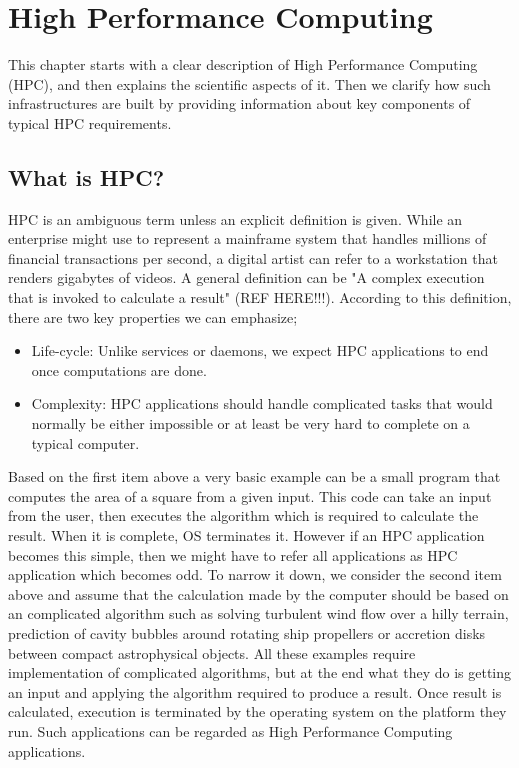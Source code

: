 \chapter{High Performance Computing} \label{chap-hpc}
This chapter starts with a clear description of High Performance Computing (HPC), and then
explains the scientific aspects of it. Then we clarify how such infrastructures are built
by providing information about key components of typical HPC requirements.

\section{What is HPC?}
HPC is an ambiguous term unless an explicit definition is given. While an enterprise might 
use to represent a mainframe system that handles millions of financial transactions per second, 
a digital artist can refer to a workstation that renders gigabytes of videos. A general 
definition can be "A complex execution that is invoked to calculate a result" (REF HERE!!!). 
According to this definition, there are two key properties we can emphasize; 
\begin{itemize}
  \item Life-cycle: Unlike services or daemons, we expect HPC applications to end once 
computations are done.
  \item Complexity: HPC applications should handle complicated tasks that would normally 
be either impossible or at least be very hard to complete on a typical computer.
\end{itemize}
Based on the first item above a very basic example can be a small program that computes 
the area of a square from a given input. This code can take an input from the user, then 
executes the algorithm which is required to calculate the result. When it is complete, OS 
terminates it. 
\newline \newline
However if an HPC application becomes this simple, then we might have to refer all 
applications as HPC application which becomes odd. To narrow it down, we consider the 
second item above and assume that the calculation made by the computer should be based 
on an complicated algorithm such as solving turbulent wind flow over a hilly terrain, 
prediction of cavity bubbles around rotating ship propellers or accretion disks between 
compact astrophysical objects. 
\newline \newline
All these examples require implementation of complicated algorithms, but at the end what 
they do is getting an input and applying the algorithm required to produce a result. 
Once result is calculated, execution is terminated by the operating system on the platform 
they run. Such applications can be regarded as High Performance Computing applications.  

